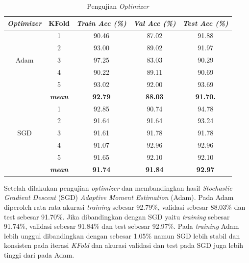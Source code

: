         \begin{table}[H]
        \centering
        \caption{Pengujian \textit{Optimizer}}
        \begin{tabular}{ccccc}
            \toprule
            \textbf{\textit{Optimizer}} & \multicolumn{1}{c}{\textbf{KFold}} & \textbf{\textit{Train Acc (\%) } } & \textbf{\textit{Val Acc (\%)}} & \textbf{\textit{Test Acc (\%)}}\\
        
            \midrule
            \multirow{5}{*}{Adam} 
            & 1 & 90.46 & 87.02 & 91.88 \\
            & 2 & 93.00 & 89.02 & 91.97 \\
            & 3 & 97.25 & 83.03 & 90.29 \\
            & 4 & 90.22 & 89.11 & 90.69 \\
            & 5 & 93.02 & 92.00 & 93.69 \\ 
            & \textit{\textbf{mean}}& \textbf{92.79} & \textbf{88.03} &\textbf{91.70.} \\ 
            \hline

    
            \multirow{5}{*}{SGD}
            & 1 & 92.85 & 90.74 & 94.78 \\
            & 2 & 91.64 & 91.64 & 93.24 \\
            & 3 & 91.61 & 91.78 & 91.78 \\
            & 4 & 91.07 & 92.96 & 92.96 \\
            & 5 & 91.65 & 92.10 & 92.10  \\
            & \textit{\textbf{mean}}& \textbf{91.74} & \textbf{91.84} &\textbf{92.97} \\ 
    

            \bottomrule
        \end{tabular}
        \label{Pengujian Optimizer}
    \end{table}


    Setelah dilakukan pengujian \textit{optimizer} dan membandingkan 
    hasil \textit{Stochastic Gradient Descent} (SGD) 
     \textit{Adaptive Moment Estimation} (Adam). 
     Pada Adam diperoleh rata-rata akurasi \textit{training} 
     sebesar 92.79\%, validasi sebesar 88.03\% dan test sebesar 91.70\%. 
     Jika dibandingkan dengan SGD yaitu \textit{training} sebesar 91.74\%, 
     validasi sebesar 91.84\% dan test sebesar 92.97\%. Pada 
      \textit{training} Adam lebih unggul dibandingkan dengan 
       sebesar 1.05\% namun SGD lebih stabil dan konsisten pada 
        iterasi \textit{KFold} dan akurasi validasi dan test pada SGD
         juga lebih tinggi dari pada Adam.
    

